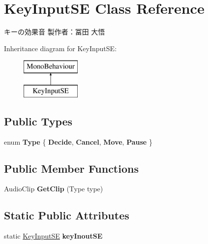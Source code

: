 \hypertarget{class_key_input_s_e}{}\section{Key\+Input\+SE Class Reference}
\label{class_key_input_s_e}


キーの効果音 製作者：冨田 大悟  


Inheritance diagram for Key\+Input\+SE\+:\begin{figure}[H]
\begin{center}
\leavevmode
\includegraphics[height=2.000000cm]{class_key_input_s_e}
\end{center}
\end{figure}
\subsection*{Public Types}
\begin{DoxyCompactItemize}
\item 
\mbox{\label{class_key_input_s_e_aef5ae8f15dafae59d13c75c267d877a1}} 
enum {\bfseries Type} \{ {\bfseries Decide}, 
{\bfseries Cancel}, 
{\bfseries Move}, 
{\bfseries Pause}
 \}
\end{DoxyCompactItemize}
\subsection*{Public Member Functions}
\begin{DoxyCompactItemize}
\item 
\mbox{\label{class_key_input_s_e_ae4b6d51643cc1a50257d25bd823a8026}} 
Audio\+Clip {\bfseries Get\+Clip} (Type type)
\end{DoxyCompactItemize}
\subsection*{Static Public Attributes}
\begin{DoxyCompactItemize}
\item 
\mbox{\label{class_key_input_s_e_ae5d788dadd50b01fc4744e71da865c49}} 
static \hyperlink{class_key_input_s_e}{Key\+Input\+SE} {\bfseries key\+Inout\+SE}
\end{DoxyCompactItemize}
